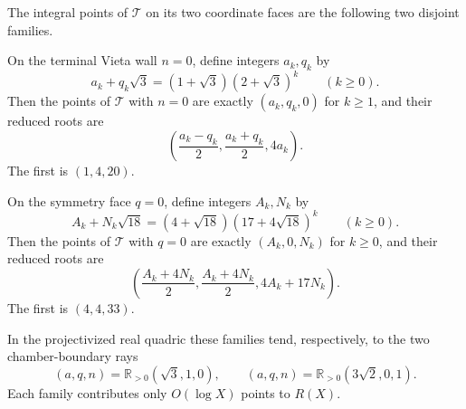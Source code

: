 \begin{proposition}
\label{koide-count-prop-pell-faces}
The integral points of $\mathcal T$ on its two coordinate faces are the
following two disjoint families.

On the terminal Vieta wall $n=0$, define integers $a_k,q_k$ by
\begin{equation}
 a_k+q_k\sqrt3=(1+\sqrt3)(2+\sqrt3)^k
 \qquad(k\geq0).
 \label{koide-count-eq-wall-pell-sequence}
\end{equation}
Then the points of $\mathcal T$ with $n=0$ are exactly
$(a_k,q_k,0)$ for $k\geq1$, and their reduced roots are
\begin{equation}
 \left(
  \frac{a_k-q_k}{2},
  \frac{a_k+q_k}{2},
  4a_k
 \right).
 \label{koide-count-eq-wall-pell-roots}
\end{equation}
The first is $(1,4,20)$.

On the symmetry face $q=0$, define integers $A_k,N_k$ by
\begin{equation}
 A_k+N_k\sqrt{18}=(4+\sqrt{18})(17+4\sqrt{18})^k
 \qquad(k\geq0).
 \label{koide-count-eq-symmetric-pell-sequence}
\end{equation}
Then the points of $\mathcal T$ with $q=0$ are exactly
$(A_k,0,N_k)$ for $k\geq0$, and their reduced roots are
\begin{equation}
 \left(
  \frac{A_k+4N_k}{2},
  \frac{A_k+4N_k}{2},
  4A_k+17N_k
 \right).
 \label{koide-count-eq-symmetric-pell-roots}
\end{equation}
The first is $(4,4,33)$.

In the projectivized real quadric these families tend, respectively, to
the two chamber-boundary rays
\begin{equation}
 (a,q,n)=\mathbb R_{>0}(\sqrt3,1,0),
 \qquad
 (a,q,n)=\mathbb R_{>0}(3\sqrt2,0,1).
 \label{koide-count-eq-pell-limit-rays}
\end{equation}
Each family contributes only $O(\log X)$ points to $R(X)$.
\end{proposition}

